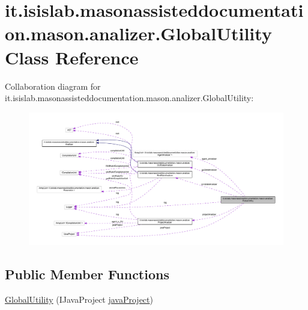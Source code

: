 \hypertarget{classit_1_1isislab_1_1masonassisteddocumentation_1_1mason_1_1analizer_1_1_global_utility}{\section{it.\-isislab.\-masonassisteddocumentation.\-mason.\-analizer.\-Global\-Utility Class Reference}
\label{classit_1_1isislab_1_1masonassisteddocumentation_1_1mason_1_1analizer_1_1_global_utility}
}


Collaboration diagram for it.\-isislab.\-masonassisteddocumentation.\-mason.\-analizer.\-Global\-Utility\-:
\nopagebreak
\begin{figure}[H]
\begin{center}
\leavevmode
\includegraphics[width=350pt]{classit_1_1isislab_1_1masonassisteddocumentation_1_1mason_1_1analizer_1_1_global_utility__coll__graph}
\end{center}
\end{figure}
\subsection*{Public Member Functions}
\begin{DoxyCompactItemize}
\item 
\hyperlink{classit_1_1isislab_1_1masonassisteddocumentation_1_1mason_1_1analizer_1_1_global_utility_abcfe6c4f11c8b1bac63a16758117449c}{Global\-Utility} (I\-Java\-Project \hyperlink{classit_1_1isislab_1_1masonassisteddocumentation_1_1mason_1_1analizer_1_1_global_utility_aba72c531253eef1bc593a95ab7935605}{java\-Project})
\end{DoxyCompactItemize}
